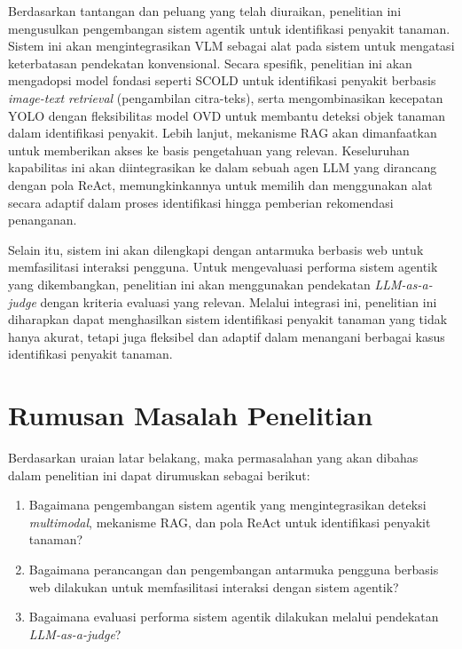 Berdasarkan tantangan dan peluang yang telah diuraikan, penelitian ini mengusulkan pengembangan sistem agentik untuk identifikasi penyakit tanaman. Sistem ini akan mengintegrasikan VLM sebagai alat pada sistem untuk mengatasi keterbatasan pendekatan konvensional. Secara spesifik, penelitian ini akan mengadopsi model fondasi seperti SCOLD untuk identifikasi penyakit berbasis \textit{image-text retrieval} (pengambilan citra-teks), serta mengombinasikan kecepatan YOLO dengan fleksibilitas model OVD untuk membantu deteksi objek tanaman dalam identifikasi penyakit. Lebih lanjut, mekanisme RAG akan dimanfaatkan untuk memberikan akses ke basis pengetahuan yang relevan. Keseluruhan kapabilitas ini akan diintegrasikan ke dalam sebuah agen LLM yang dirancang dengan pola ReAct, memungkinkannya untuk memilih dan menggunakan alat secara adaptif dalam proses identifikasi hingga pemberian rekomendasi penanganan. 

Selain itu, sistem ini akan dilengkapi dengan antarmuka berbasis web untuk memfasilitasi interaksi pengguna. Untuk mengevaluasi performa sistem agentik yang dikembangkan, penelitian ini akan menggunakan pendekatan \textit{LLM-as-a-judge} dengan kriteria evaluasi yang relevan. Melalui integrasi ini, penelitian ini diharapkan dapat menghasilkan sistem identifikasi penyakit tanaman yang tidak hanya akurat, tetapi juga fleksibel dan adaptif dalam menangani berbagai kasus identifikasi penyakit tanaman.

\section{Rumusan Masalah Penelitian}
Berdasarkan uraian latar belakang, maka permasalahan yang akan dibahas dalam penelitian ini dapat dirumuskan sebagai berikut: 
\begin{enumerate}[nosep]
    \item Bagaimana pengembangan sistem agentik yang mengintegrasikan deteksi \textit{multimodal}, mekanisme RAG, dan pola ReAct untuk identifikasi penyakit tanaman?
    \item Bagaimana perancangan dan pengembangan antarmuka pengguna berbasis web dilakukan untuk memfasilitasi interaksi dengan sistem agentik?
    \item Bagaimana evaluasi performa sistem agentik dilakukan melalui pendekatan \textit{LLM-as-a-judge}?
\end{enumerate}

